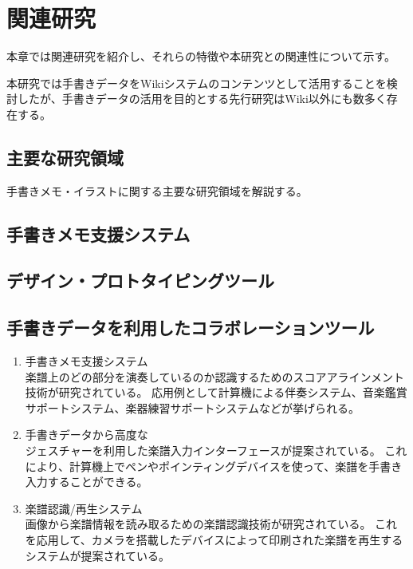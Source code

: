 \chapter{関連研究}
\label{chap:kanren}

本章では関連研究を紹介し、それらの特徴や本研究との関連性について示す。

\newpage

本研究では手書きデータをWikiシステムのコンテンツとして活用することを検討したが、手書きデータの活用を目的とする先行研究はWiki以外にも数多く存在する。

\section{主要な研究領域}
手書きメモ・イラストに関する主要な研究領域を解説する。

\section{手書きメモ支援システム}

\section{デザイン・プロトタイピングツール}

\section{手書きデータを利用したコラボレーションツール}

\begin{enumerate}
    \item 手書きメモ支援システム\\
    楽譜上のどの部分を演奏しているのか認識するためのスコアアラインメント技術が研究されている\cite{online}\cite{learning}\cite{coupled}\cite{automatic}。
    応用例として計算機による伴奏システム\cite{muens}\cite{mysong}、音楽鑑賞サポートシステム\cite{orchestra}、楽器練習サポートシステムなどが挙げられる\cite{tutor}。
    \item 手書きデータから高度な\\
    ジェスチャーを利用した楽譜入力インターフェースが提案されている\cite{notepad}\cite{pen}\cite{sssp}。
    これにより、計算機上でペンやポインティングデバイスを使って、楽譜を手書き入力することができる。
    \item 楽譜認識/再生システム\\
    画像から楽譜情報を読み取るための楽譜認識技術が研究されている\cite{optical}\cite{early}\cite{symbol}。
    これを応用して、カメラを搭載したデバイスによって印刷された楽譜を再生するシステムが提案されている\cite{onnote}\cite{gocen}。
\end{enumerate}